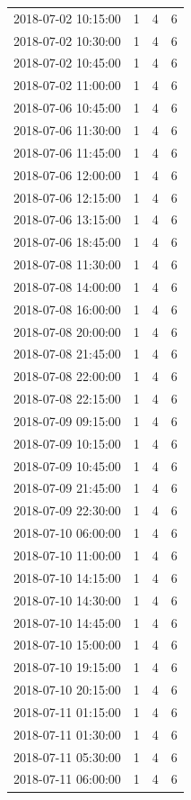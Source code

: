 \begin{tabular}{lrrr}
2018-07-02 10:15:00 & 1 & 4 & 6 \\
2018-07-02 10:30:00 & 1 & 4 & 6 \\
2018-07-02 10:45:00 & 1 & 4 & 6 \\
2018-07-02 11:00:00 & 1 & 4 & 6 \\
2018-07-06 10:45:00 & 1 & 4 & 6 \\
2018-07-06 11:30:00 & 1 & 4 & 6 \\
2018-07-06 11:45:00 & 1 & 4 & 6 \\
2018-07-06 12:00:00 & 1 & 4 & 6 \\
2018-07-06 12:15:00 & 1 & 4 & 6 \\
2018-07-06 13:15:00 & 1 & 4 & 6 \\
2018-07-06 18:45:00 & 1 & 4 & 6 \\
2018-07-08 11:30:00 & 1 & 4 & 6 \\
2018-07-08 14:00:00 & 1 & 4 & 6 \\
2018-07-08 16:00:00 & 1 & 4 & 6 \\
2018-07-08 20:00:00 & 1 & 4 & 6 \\
2018-07-08 21:45:00 & 1 & 4 & 6 \\
2018-07-08 22:00:00 & 1 & 4 & 6 \\
2018-07-08 22:15:00 & 1 & 4 & 6 \\
2018-07-09 09:15:00 & 1 & 4 & 6 \\
2018-07-09 10:15:00 & 1 & 4 & 6 \\
2018-07-09 10:45:00 & 1 & 4 & 6 \\
2018-07-09 21:45:00 & 1 & 4 & 6 \\
2018-07-09 22:30:00 & 1 & 4 & 6 \\
2018-07-10 06:00:00 & 1 & 4 & 6 \\
2018-07-10 11:00:00 & 1 & 4 & 6 \\
2018-07-10 14:15:00 & 1 & 4 & 6 \\
2018-07-10 14:30:00 & 1 & 4 & 6 \\
2018-07-10 14:45:00 & 1 & 4 & 6 \\
2018-07-10 15:00:00 & 1 & 4 & 6 \\
2018-07-10 19:15:00 & 1 & 4 & 6 \\
2018-07-10 20:15:00 & 1 & 4 & 6 \\
2018-07-11 01:15:00 & 1 & 4 & 6 \\
2018-07-11 01:30:00 & 1 & 4 & 6 \\
2018-07-11 05:30:00 & 1 & 4 & 6 \\
2018-07-11 06:00:00 & 1 & 4 & 6 \\

\end{tabular}
